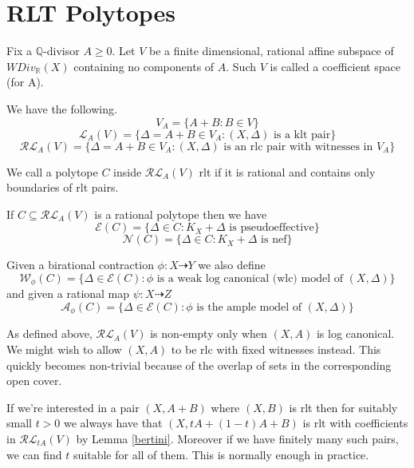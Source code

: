 \documentclass[a4paper,12pt]{amsart}
\begin{document}
	\section{RLT Polytopes}
	
	\begin{definition}
		
		Fix a $\mathbb{Q}$-divisor $A\geq 0$. Let $V$ be a finite dimensional, rational affine subspace of $WDiv_{\mathbb{R}}(X)$ containing no components of $A$. Such $V$ is called a coefficient space (for A).
		
		We have the following.
		\[V_{A}= \{A+B: B \in V\}\]
		\[\mathcal{L}_{A}(V)=\{\Delta=A+B \in V_{A}: (X,\Delta) \text{ is a klt pair}\}\]
		\[\mathcal{RL}_{A}(V)=\{\Delta=A+B \in V_{A}: (X,\Delta) \text{ is an rlc pair with witnesses in } V_{A}\}\]
		
		We call a polytope $C$ inside $\mathcal{RL}_{A}(V)$ rlt if it is rational and contains only boundaries of rlt pairs.
		
		If $C \subseteq \mathcal{RL}_{A}(V)$ is a rational polytope then we have
		\[\mathcal{E}(C)=\{\Delta \in C: K_{X}+\Delta \text{ is pseudoeffective}\}\]
		\[\mathcal{N}(C)=\{\Delta \in C: K_{X}+\Delta \text{ is nef}\}\]
		
		Given a birational contraction $\phi:X \dashrightarrow Y$ we also define
		\[\mathcal{W}_{\phi}(C)=\{\Delta \in \mathcal{E}(C): \phi \text{ is a weak log canonical (wlc) model of } (X,\Delta)\}\]
		and given a rational map $\psi:X \dashrightarrow Z$
		\[\mathcal{A}_{\phi}(C)=\{\Delta \in \mathcal{E}(C): \phi \text{ is the ample model of } (X,\Delta)\}\]
	\end{definition}
	
	
	\begin{remark}
		
		As defined above, $\mathcal{RL}_{A}(V)$ is non-empty only when $(X,A)$ is log canonical. We might wish to allow $(X,A)$ to be rlc with fixed witnesses instead. This quickly becomes non-trivial because of the overlap of sets in the corresponding open cover.
		
		If we're interested in a pair $(X,A+B)$ where $(X,B)$ is rlt then for suitably small $t>0$ we always have that $(X,tA+(1-t)A+B)$ is rlt with coefficients in $\mathcal{RL}_{tA}(V)$ by Lemma \ref{bertini}. Moreover if we have finitely many such pairs, we can find $t$ suitable for all of them. This is normally enough in practice.
		
	\end{remark}
	
\end{document}
